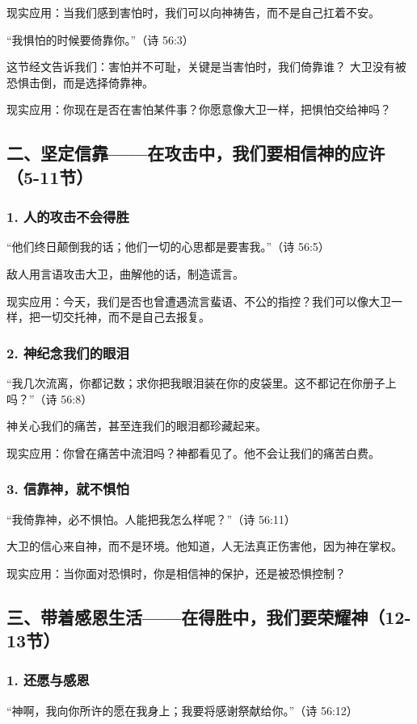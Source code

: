 \documentclass[a4paper, 12pt]{article}
\begin{document}
现实应用：当我们感到害怕时，我们可以向神祷告，而不是自己扛着不安。

\vspace{0.2cm}

“我惧怕的时候要倚靠你。”（诗 56:3）

这节经文告诉我们：害怕并不可耻，关键是当害怕时，我们倚靠谁？
大卫没有被恐惧击倒，而是选择倚靠神。

现实应用：你现在是否在害怕某件事？你愿意像大卫一样，把惧怕交给神吗？
\subsection*{二、坚定信靠——在攻击中，我们要相信神的应许（5-11节）}
\subsubsection*{1. 人的攻击不会得胜}
“他们终日颠倒我的话；他们一切的心思都是要害我。”（诗 56:5）

敌人用言语攻击大卫，曲解他的话，制造谎言。

现实应用：今天，我们是否也曾遭遇流言蜚语、不公的指控？我们可以像大卫一样，把一切交托神，而不是自己去报复。
\subsubsection*{2. 神纪念我们的眼泪}
“我几次流离，你都记数；求你把我眼泪装在你的皮袋里。这不都记在你册子上吗？”（诗 56:8）

神关心我们的痛苦，甚至连我们的眼泪都珍藏起来。

现实应用：你曾在痛苦中流泪吗？神都看见了。他不会让我们的痛苦白费。
\subsubsection*{3. 信靠神，就不惧怕}
“我倚靠神，必不惧怕。人能把我怎么样呢？”（诗 56:11）

大卫的信心来自神，而不是环境。他知道，人无法真正伤害他，因为神在掌权。

现实应用：当你面对恐惧时，你是相信神的保护，还是被恐惧控制？
\subsection*{三、带着感恩生活——在得胜中，我们要荣耀神（12-13节）}
\subsubsection*{1. 还愿与感恩}
“神啊，我向你所许的愿在我身上；我要将感谢祭献给你。”（诗 56:12）
\end{document}
